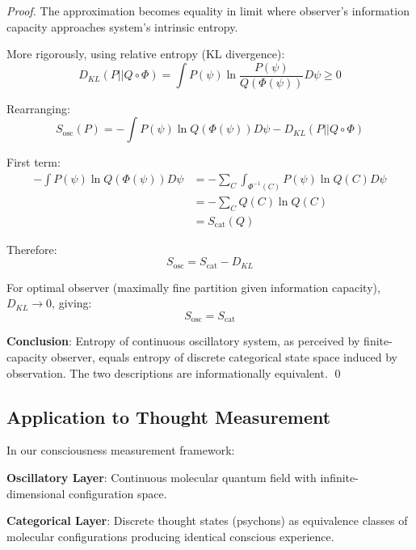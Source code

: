 \documentclass[11pt,onecolumn]{article}
\begin{document}
\begin{proof}
The approximation becomes equality in limit where observer's information capacity approaches system's intrinsic entropy.

More rigorously, using relative entropy (KL divergence):
\begin{equation}
D_{KL}(P || Q \circ \Phi) = \int P(\psi) \ln \frac{P(\psi)}{Q(\Phi(\psi))} D\psi \geq 0
\end{equation}

Rearranging:
\begin{equation}
S_{\text{osc}}(P) = -\int P(\psi) \ln Q(\Phi(\psi)) D\psi - D_{KL}(P || Q \circ \Phi)
\end{equation}

First term:
\begin{align}
-\int P(\psi) \ln Q(\Phi(\psi)) D\psi &= -\sum_{C} \int_{\Phi^{-1}(C)} P(\psi) \ln Q(C) D\psi \\
&= -\sum_{C} Q(C) \ln Q(C) \\
&= S_{\text{cat}}(Q)
\end{align}

Therefore:
\begin{equation}
S_{\text{osc}} = S_{\text{cat}} - D_{KL}
\end{equation}

For optimal observer (maximally fine partition given information capacity), $D_{KL} \to 0$, giving:
\begin{equation}
S_{\text{osc}} = S_{\text{cat}}
\end{equation}

\textbf{Conclusion}: Entropy of continuous oscillatory system, as perceived by finite-capacity observer, equals entropy of discrete categorical state space induced by observation. The two descriptions are informationally equivalent. \qed
\end{proof}

\subsection{Application to Thought Measurement}

In our consciousness measurement framework:

\textbf{Oscillatory Layer}: Continuous  molecular quantum field with infinite-dimensional configuration space.

\textbf{Categorical Layer}: Discrete thought states (psychons) as equivalence classes of molecular configurations producing identical conscious experience.
\end{document}
